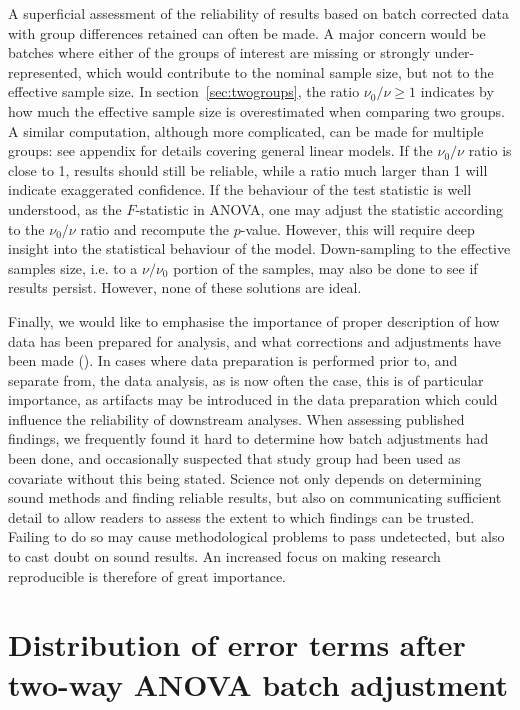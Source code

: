 \documentclass{bio}
\begin{document}
A superficial assessment of the reliability of results based on batch corrected data with group differences retained can often be made. A major concern would be batches where either of the groups of interest are missing or strongly under-represented, which would contribute to the nominal sample size, but not to the effective sample size. In section~\ref{sec:twogroups}, the ratio $\nu_0/\nu\ge1$ indicates by how much the effective sample size is overestimated when comparing two groups. A similar computation, although more complicated, can be made for multiple groups: see appendix for details covering general linear models. If the $\nu_0/\nu$ ratio is close to 1, results should still be reliable, while a ratio much larger than 1 will indicate exaggerated confidence. If the behaviour of the test statistic is well understood, as the $F$-statistic in ANOVA, one may adjust the statistic according to the $\nu_0/\nu$ ratio and recompute the $p$-value. However, this will require deep insight into the statistical behaviour of the model. Down-sampling to the effective samples size, i.e. to a $\nu/\nu_0$ portion of the samples, may also be done to see if results persist. However, none of these solutions are ideal.

Finally, we would like to emphasise the importance of proper description of how data has been prepared for analysis, and what corrections and adjustments have been made (\citealp{Sandve2013}). In cases where data preparation is performed prior to, and separate from, the data analysis, as is now often the case, this is of particular importance, as artifacts may be introduced in the data preparation which could influence the reliability of downstream analyses. When assessing published findings, we frequently found it hard to determine how batch adjustments had been done, and occasionally suspected that study group had been used as covariate without this being stated. Science not only depends on determining sound methods and finding reliable results, but also on communicating sufficient detail to allow readers to assess the extent to which findings can be trusted. Failing to do so may cause methodological problems to pass undetected, but also to cast doubt on sound results. An increased focus on making research reproducible is therefore of great importance.



\appendix
\section{Distribution of error terms after two-way ANOVA batch adjustment}
\label{sec:chiApprox}
\end{document}
